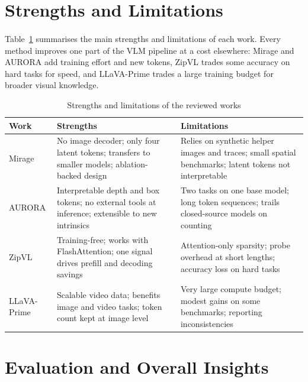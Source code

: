\documentclass[12pt,a4paper,final]{extreport}
\begin{document}
\section{Strengths and Limitations}

\paragraph{} Table~\ref{tab:cmp_sl} summarises the main strengths and limitations of each work. Every method improves one part of the VLM pipeline at a cost elsewhere: Mirage and AURORA add training effort and new tokens, ZipVL trades some accuracy on hard tasks for speed, and LLaVA-Prime trades a large training budget for broader visual knowledge.

{\renewcommand{\arraystretch}{1.15}
\begin{table}[htbp]
\centering
\caption{Strengths and limitations of the reviewed works}\label{tab:cmp_sl}
\small
\begin{tabularx}{\textwidth}{|p{2.2cm}|X|X|}
\hline
\textbf{Work} & \textbf{Strengths} & \textbf{Limitations} \\ \hline
Mirage \cite{p1} & No image decoder; only four latent tokens; transfers to smaller models; ablation-backed design & Relies on synthetic helper images and traces; small spatial benchmarks; latent tokens not interpretable \\ \hline
AURORA \cite{p2} & Interpretable depth and box tokens; no external tools at inference; extensible to new intrinsics & Two tasks on one base model; long token sequences; trails closed-source models on counting \\ \hline
ZipVL \cite{p3} & Training-free; works with FlashAttention; one signal drives prefill and decoding savings & Attention-only sparsity; probe overhead at short lengths; accuracy loss on hard tasks \\ \hline
LLaVA-Prime \cite{p4} & Scalable video data; benefits image and video tasks; token count kept at image level & Very large compute budget; modest gains on some benchmarks; reporting inconsistencies \\ \hline
\end{tabularx}
\end{table}}

\section{Evaluation and Overall Insights}
\end{document}
